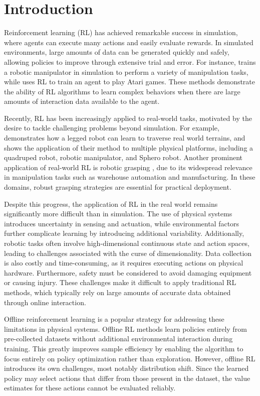 \documentclass[./dissertation.tex]{subfiles}
\begin{document}
\chapter{Introduction}
Reinforcement learning (RL) has achieved remarkable success in simulation, where agents can execute many actions and easily evaluate rewards. In simulated environments, large amounts of data can be generated quickly and safely, allowing policies to improve through extensive trial and error. For instance, \cite{SimGrasp} trains a robotic manipulator in simulation to perform a variety of manipulation tasks, while \cite{DeepQ} uses RL to train an agent to play Atari games. These methods demonstrate the ability of RL algorithms to learn complex behaviors when there are large amounts of interaction data available to the agent. 

Recently, RL has been increasingly applied to real-world tasks, motivated by the desire to tackle challenging problems beyond simulation. For example, \cite{LegRL} demonstrates how a legged robot can learn to traverse real world terrains, and \cite{wu2023daydreamer} shows the application of their method to multiple physical platforms, including a quadruped robot, robotic manipulator, and Sphero robot. Another prominent application of real-world RL is robotic grasping \parencite{ManipSurvey}, due to its widespread relevance in manipulation tasks such as warehouse automation and manufacturing. In these domains, robust grasping strategies are essential for practical deployment. 

Despite this progress, the application of RL in the real world remains significantly more difficult than in simulation. The use of physical systems introduces uncertainty in sensing and actuation, while environmental factors further complicate learning by introducing additional variability. Additionally, robotic tasks often involve high-dimensional continuous state and action spaces, leading to challenges associated with the curse of dimensionality. Data collection is also costly and time-consuming, as it requires executing actions on physical hardware. Furthermore, safety must be considered to avoid damaging equipment or causing injury. These challenges make it difficult to apply traditional RL methods, which typically rely on large amounts of accurate data obtained through online interaction.

Offline reinforcement learning is a popular strategy for addressing these limitations in physical systems. Offline RL methods learn policies entirely from pre-collected datasets without additional environmental interaction during training. This greatly improves sample efficiency by enabling the algorithm to focus entirely on policy optimization rather than exploration. However, offline RL introduces its own challenges, most notably distribution shift. Since the learned policy may select actions that differ from those present in the dataset, the value estimates for these actions cannot be evaluated reliably. 
\end{document}
